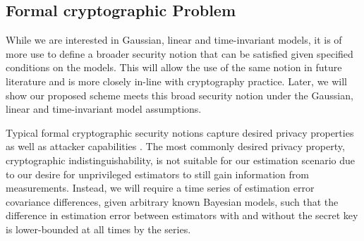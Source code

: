 \documentclass[conference]{IEEEtran}
\theoremstyle{definition}
\theoremstyle{definition}
\theoremstyle{remark}
\begin{document}
% 
% 

\subsection{Formal cryptographic Problem}\label{subsec:crypto_problem}
While we are interested in Gaussian, linear and time-invariant models, it is of more use to define a broader security notion that can be satisfied given specified conditions on the models. This will allow the use of the same notion in future literature and is more closely in-line with cryptography practice. Later, we will show our proposed scheme meets this broad security notion under the Gaussian, linear and time-invariant model assumptions.

Typical formal cryptographic security notions capture desired privacy properties as well as attacker capabilities \cite{katzIntroductionModernCryptography2008}. The most commonly desired privacy property, cryptographic indistinguishability, is not suitable for our estimation scenario due to our desire for unprivileged estimators to still gain  information from measurements. Instead, we will require a time series of estimation error covariance differences, given arbitrary known Bayesian models, such that the difference in estimation error between estimators with and without the secret key is lower-bounded at all times by the series.
\end{document}
